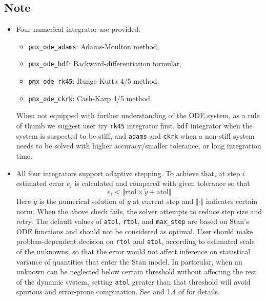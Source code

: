 \documentclass[12pt, reqno, oneside]{amsbook}
\numberwithin{equation}{chapter}
\numberwithin{figure}{chapter}
\numberwithin{table}{chapter}
\theoremstyle{remark}
\begin{document}
\subsection{Note}
\label{sec:orgf701db1}
\begin{itemize}
\item Four numerical integrator are provided:
\begin{itemize}
\item \texttt{pmx\_ode\_adams}: Adams-Moulton method,
\item \texttt{pmx\_ode\_bdf}: Backward-differentiation formular,
\item \texttt{pmx\_ode\_rk45}: Runge-Kutta 4/5 method.
\item \texttt{pmx\_ode\_ckrk}: Cash-Karp 4/5 method.
\end{itemize}
When not equipped with further understanding of the ODE system, as a
rule of thumb we suggest user try
\texttt{rk45} integrator first, \texttt{bdf}
integrator when the system is suspected to be stiff, and
\texttt{adams} and \texttt{ckrk} when a non-stiff system needs to be solved
with higher accuracy/smaller tolerance, or long integration time.

\item All four integrators support adaptive stepping. To achieve
that, at step \(i\) estimated error \(e_i\) is calculated and
compared with given tolerance so that
\begin{equation}
  e_i < \Vert\text{rtol} \times \tilde{y} + \text{atol}\Vert
\end{equation}
Here \(\tilde{y}\) is the numerical solution of \(y\) at current
step and \(\Vert \cdot \Vert\) indicates certain norm. When the above check fails, the solver attempts
to reduce step size and retry. The default values of \texttt{atol},
\texttt{rtol}, and \texttt{max\_step} are
based on Stan's ODE functions and should not be considered as
optimal. User should make problem-dependent
decision on \texttt{rtol} and \texttt{atol},
according to estimated scale of the unknowns, so that the error
would not affect inference on statistical variance of quantities
that enter the Stan model. In particular, when an unknown can be neglected
below certain threshold without affecting the rest of
the dynamic system, setting
\texttt{atol} greater than that threshold will avoid
spurious and error-prone computation. See
\cite{hindmarsh_cvodes_2020} and
1.4 of \cite{shampine_solving_2003} for details.

\end{itemize}
\end{document}
